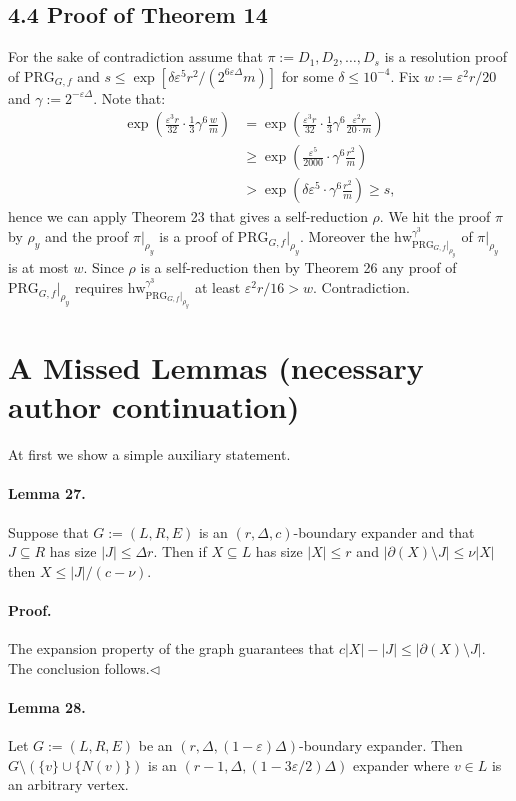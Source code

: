 \subsection*{4.4 Proof of Theorem 14}
For the sake of contradiction assume that $\pi:=D_1,D_2,\ldots,D_s$ is a resolution proof of $\mathrm{PRG}_{G,f}$ and $s\leq\exp[\delta\varepsilon^5r^2/(2^{6\varepsilon\Delta}m)]$ for some $\delta\leq10^{-4}$.
Fix $w:=\varepsilon^2r/20$ and $\gamma:=2^{-\varepsilon\Delta}$. Note that:
\begin{align*}
\exp\left(\frac{\varepsilon^3r}{32}\cdot\frac13\gamma^6\frac wm\right)
&=\exp\left(\frac{\varepsilon^3r}{32}\cdot\frac13\gamma^6\frac{\varepsilon^2r}{20\cdot m}\right)\\
&\geq\exp\left(\frac{\varepsilon^5}{2000}\cdot\gamma^6\frac{r^2}m\right)\\
&>\exp\left(\delta\varepsilon^5\cdot\gamma^6\frac{r^2}m\right)\geq s,
\end{align*}
hence we can apply Theorem 23 that gives a self-reduction $\rho$. We hit the proof $\pi$ by $\rho_y$ and the proof $\pi|_{\rho_y}$ is a proof of $\mathrm{PRG}_{G,f}|_{\rho_y}$. Moreover the $\mathrm{hw}_{\mathrm{PRG}_{G,f}|_{\rho_y}}^{\gamma^3}$ of $\pi|_{\rho_y}$ is at most $w$.
Since $\rho$ is a self-reduction then by Theorem 26 any proof of $\mathrm{PRG}_{G,f}|_{\rho_y}$ requires $\mathrm{hw}_{\mathrm{PRG}_{G,f}|_{\rho_y}}^{\gamma^3}$ at least $\varepsilon^2r/16>w$. Contradiction.

\section*{A Missed Lemmas (necessary author continuation)}
At first we show a simple auxiliary statement.
\paragraph{Lemma 27.} Suppose that $G:=(L,R,E)$ is an $(r,\Delta,c)$-boundary expander and that $J\subseteq R$ has size $|J|\leq\Delta r$. Then if $X\subseteq L$ has size $|X|\leq r$ and $|\partial(X)\setminus J|\leq\nu|X|$ then $X\leq|J|/(c-\nu)$.
\paragraph{Proof.} The expansion property of the graph guarantees that $c|X|-|J|\leq|\partial(X)\setminus J|$. The conclusion follows.\hfill$\triangleleft$
\paragraph{Lemma 28.} Let $G:=(L,R,E)$ be an $(r,\Delta,(1-\varepsilon)\Delta)$-boundary expander. Then $G\setminus(\{v\}\cup\{N(v)\})$ is an $(r-1,\Delta,(1-3\varepsilon/2)\Delta)$ expander where $v\in L$ is an arbitrary vertex.
